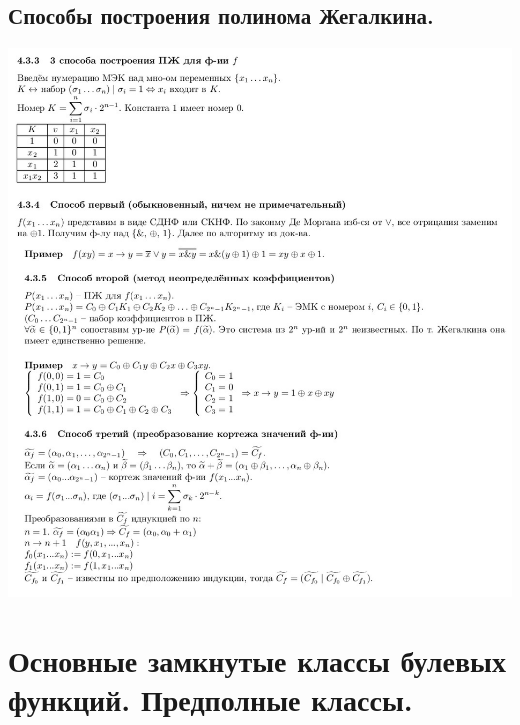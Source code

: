 \documentclass[12pt]{article}
\begin{document}
\subsection{Способы построения полинома Жегалкина.}
	\includegraphics[width=550pt]{24}

\section{Основные замкнутые классы булевых функций. Предполные классы.}
\end{document}
